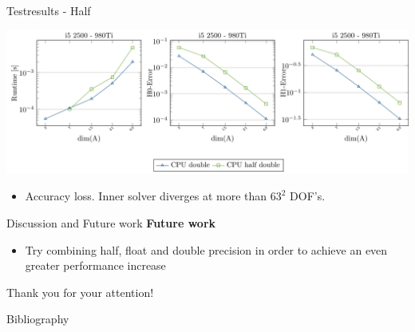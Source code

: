 \documentclass[10pt]{beamer}
\begin{document}
\begin{frame}{Testresults - Half}
\begin{center}
\includegraphics[width=\textwidth]{figures/z-plots4.pdf}
\end{center}
\begin{itemize}
 \item Accuracy loss. Inner solver diverges at more than $63^2$ DOF's.
\end{itemize}
\end{frame}


\begin{frame}{Discussion and Future work}
 \textbf{Future work}
 \begin{itemize}
  \item Try combining half, float and double precision in order to achieve an even greater performance increase
 \end{itemize}
 
 \vfill
 \begin{center}
  Thank you for your attention!
 \end{center}

\end{frame}

\begin{frame}{Bibliography}
 
 
\end{frame}
\end{document}
